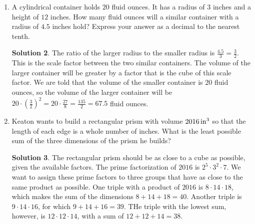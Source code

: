 \documentclass{article}
\theoremstyle{definition}
\newtheorem*{solution}{Solution}
\begin{document}
\begin{multicols}{2}
\begin{enumerate}
\begin{solution}
            It will take $1728 \div 12 = 144$ prisms to fill the cube.
        \end{solution}
        \item A cylindrical container holds $20$ fluid ounces.
        It has a radius of $3$ inches and a height of $12$ inches.
        How many fluid ounces will a similar container with a radius of $4.5$ inches hold?
        Express your answer as a decimal to the nearest tenth.
        \begin{solution}
            The ratio of the larger radius to the smaller radius is $\frac{4.5}{3} = \frac{3}{2}$.
            This is the scale factor between the two similar containers.
            The volume of the larger container will be greater by a factor that is the cube of this scale factor.
            We are told that the volume of the smaller container is $20$ fluid ounces, so the volume of the larger container will be $20 \cdot \left( \frac{3}{2} \right)^2 = 20 \cdot \frac{27}{8} = \frac{135}{2} = 67.5$ fluid ounces.
        \end{solution}
        \item Keaton wants to build a rectangular prism with volume $\SI{2016}{in\cubed}$ so that the length of each edge is a whole number of inches.
        What is the least possible sum of the three dimensions of the prism he builds?
        \begin{solution}
            The rectangular prism should be as close to a cube as possible, given the available factors.
            The prime factorization of $2016$ is $2^5 \cdot 3^2 \cdot 7$.
            We want to assign these prime factors to three groups that have as close to the same product as possible.
            One triple with a product of $2016$ is $8 \cdot 14 \cdot 18$, which makes the sum of the dimensions $8 + 14 + 18 = 40$.
            Another triple is $9 \cdot 14 \cdot 16$, for which $9 + 14 + 16 = 39$.
            THe triple with the lowest sum, however, is $12 \cdot 12 \cdot 14$, with a sum of $12 + 12 + 14 =38$.
        \end{solution}
    \end{enumerate}
\end{multicols}
\end{document}
